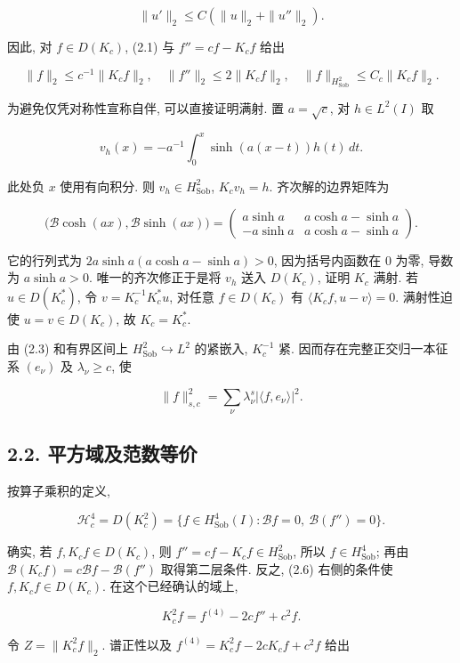 \documentclass[UTF8,fontset=fandol,11pt,a4paper]{ctexart}
\begin{document}
\[
 \|u'\|_2\le C(\|u\|_2+\|u''\|_2).
 \tag{2.2}
\]


因此, 对 \(f\in D(K_c)\), (2.1) 与 \(f''=cf-K_cf\) 给出


\[
 \|f\|_2\le c^{-1}\|K_cf\|_2,\quad
 \|f''\|_2\le2\|K_cf\|_2,\quad
 \|f\|_{H_{\mathrm{Sob}}^2}\le C_c\|K_cf\|_2.
 \tag{2.3}
\]


为避免仅凭对称性宣称自伴, 可以直接证明满射. 置 \(a=\sqrt c\), 对 \(h\in L^2(I)\) 取


\[
 v_h(x)=-a^{-1}\int_0^x\sinh(a(x-t))h(t)\,dt.
\]


此处负 \(x\) 使用有向积分. 则 \(v_h\in H_{\mathrm{Sob}}^2\), \(K_cv_h=h\). 齐次解的边界矩阵为


\[
 \bigl(\mathcal B\cosh(ax),\mathcal B\sinh(ax)\bigr)=
 \begin{pmatrix}a\sinh a&a\cosh a-\sinh a\\
                 -a\sinh a&a\cosh a-\sinh a\end{pmatrix}.
 \tag{2.4}
\]


它的行列式为 \(2a\sinh a(a\cosh a-\sinh a)>0\), 因为括号内函数在 0 为零, 导数为 \(a\sinh a>0\). 唯一的齐次修正于是将 \(v_h\) 送入 \(D(K_c)\), 证明 \(K_c\) 满射. 若 \(u\in D(K_c^*)\), 令 \(v=K_c^{-1}K_c^*u\), 对任意 \(f\in D(K_c)\) 有
\(\langle K_cf,u-v\rangle=0\). 满射性迫使 \(u=v\in D(K_c)\), 故 \(K_c=K_c^*\).


由 (2.3) 和有界区间上 \(H_{\mathrm{Sob}}^2\hookrightarrow L^2\) 的紧嵌入, \(K_c^{-1}\) 紧. 因而存在完整正交归一本征系 \((e_\nu)\) 及 \(\lambda_\nu\ge c\), 使


\[
 \|f\|_{s,c}^2=\sum_\nu\lambda_\nu^s|\langle f,e_\nu\rangle|^2.
 \tag{2.5}
\]


\subsection*{2.2. 平方域及范数等价}

按算子乘积的定义,


\[
 \boxed{\mathcal H_c^4=D(K_c^2)
 =\{f\in H_{\mathrm{Sob}}^4(I):
       \mathcal Bf=0,\ \mathcal B(f'')=0\}.}
 \tag{2.6}
\]


确实, 若 \(f,K_cf\in D(K_c)\), 则 \(f''=cf-K_cf\in H_{\mathrm{Sob}}^2\), 所以 \(f\in H_{\mathrm{Sob}}^4\); 再由
\(\mathcal B(K_cf)=c\mathcal Bf-\mathcal B(f'')\)
取得第二层条件. 反之, (2.6) 右侧的条件使 \(f,K_cf\in D(K_c)\). 在这个已经确认的域上,


\[
 K_c^2f=f^{(4)}-2cf''+c^2f.
 \tag{2.7}
\]


令 \(Z=\|K_c^2f\|_2\). 谱正性以及
\(f^{(4)}=K_c^2f-2cK_cf+c^2f\) 给出
\end{document}
